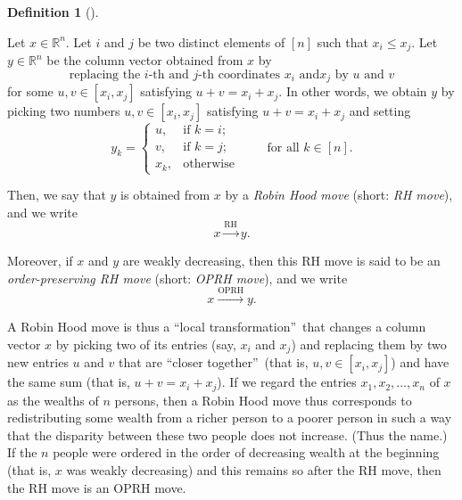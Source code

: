 \documentclass[numbers=enddot,12pt,final,onecolumn,notitlepage]{scrartcl}%
\numberwithin{exer}{subsection}
\theoremstyle{definition}
\newtheorem{defi}[theo]{Definition}
\newenvironment{definition}[1][]
{\begin{defi}[#1]\begin{leftbar}}
{\end{leftbar}\end{defi}}
\begin{document}
\begin{definition}
\label{def.major.RH}Let $x\in\mathbb{R}^{n}$. Let $i$ and $j$ be two distinct
elements of $\left[  n\right]  $ such that $x_{i}\leq x_{j}$. Let
$y\in\mathbb{R}^{n}$ be the column vector obtained from $x$ by%
\[
\text{replacing the }i\text{-th and }j\text{-th coordinates }x_{i}\text{ and
}x_{j}\text{ by }u\text{ and }v
\]
for some $u,v\in\left[  x_{i},x_{j}\right]  $ satisfying $u+v=x_{i}+x_{j}$. In
other words, we obtain $y$ by picking two numbers $u,v\in\left[  x_{i}%
,x_{j}\right]  $ satisfying $u+v=x_{i}+x_{j}$ and setting%
\[
y_{k}=%
\begin{cases}
u, & \text{if }k=i;\\
v, & \text{if }k=j;\\
x_{k}, & \text{otherwise}%
\end{cases}
\ \ \ \ \ \ \ \ \ \ \text{for all }k\in\left[  n\right]  .
\]


Then, we say that $y$ is obtained from $x$ by a \emph{Robin Hood move} (short:
\emph{RH move}), and we write
\[
x\overset{\text{RH}}{\longrightarrow}y.
\]


Moreover, if $x$ and $y$ are weakly decreasing, then this RH move is said to
be an \emph{order-preserving RH move} (short: \emph{OPRH move}), and we write
\[
x\overset{\text{OPRH}}{\longrightarrow}y.
\]

\end{definition}

A Robin Hood move is thus a \textquotedblleft local
transformation\textquotedblright\ that changes a column vector $x$ by picking
two of its entries (say, $x_{i}$ and $x_{j}$) and replacing them by two new
entries $u$ and $v$ that are \textquotedblleft closer
together\textquotedblright\ (that is, $u,v\in\left[  x_{i},x_{j}\right]  $)
and have the same sum (that is, $u+v=x_{i}+x_{j}$). If we regard the entries
$x_{1},x_{2},\ldots,x_{n}$ of $x$ as the wealths of $n$ persons, then a Robin
Hood move thus corresponds to redistributing some wealth from a richer person
to a poorer person in such a way that the disparity between these two people
does not increase. (Thus the name.) If the $n$ people were ordered in the
order of decreasing wealth at the beginning (that is, $x$ was weakly
decreasing) and this remains so after the RH move, then the RH move is an OPRH move.
\end{document}
